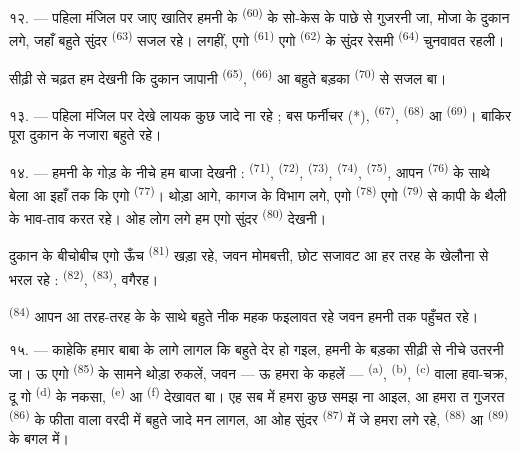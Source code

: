 १२. --- पहिला मंजिल पर जाए खातिर हमनी के 
\textsuperscript{(60)} के सो-केस के पाछे से गुजरनी जा, मोजा के दुकान लगे,
जहाँ बहुते सुंदर  \textsuperscript{(63)} सजल रहे। लगहीं,
एगो  \textsuperscript{(61)} एगो  \textsuperscript{(62)} के सुंदर रेसमी 
\textsuperscript{(64)} चुनवावत रहली।

सीढ़ी से चढ़त हम देखनी कि दुकान जापानी  \textsuperscript{(65)},
 \textsuperscript{(66)} आ बहुते बड़का 
\textsuperscript{(70)} से सजल बा।

१३. --- पहिला मंजिल पर देखे लायक कुछ जादे ना रहे ; बस फर्नीचर (*),
 \textsuperscript{(67)}, 
\textsuperscript{(68)} आ  \textsuperscript{(69)}।
बाकिर पूरा दुकान के नजारा बहुते  रहे।

१४. --- हमनी के गोड़ के नीचे हम बाजा देखनी : 
\textsuperscript{(71)},  \textsuperscript{(72)},
 \textsuperscript{(73)}, 
\textsuperscript{(74)},  \textsuperscript{(75)}, आपन
 \textsuperscript{(76)} के साथे बेला आ इहाँ तक कि एगो
 \textsuperscript{(77)}। थोड़ा आगे, कागज के विभाग लगे,
एगो  \textsuperscript{(78)} एगो 
\textsuperscript{(79)} से कापी के थैली के भाव-ताव करत रहे। ओह लोग लगे हम
एगो सुंदर  \textsuperscript{(80)} देखनी।

दुकान के बीचोबीच एगो ऊँच  \textsuperscript{(81)}
खड़ा रहे, जवन मोमबत्ती, छोट सजावट आ हर तरह के खेलौना से भरल रहे :
 \textsuperscript{(82)}, 
\textsuperscript{(83)}, वगैरह।

 \textsuperscript{(84)} आपन  आ
तरह-तरह के  के साथे बहुते नीक महक फइलावत रहे जवन हमनी तक
पहुँचत रहे।

\VUsaut{3.4mm}
\VUsaut{2.8mm}

१५. --- काहेकि हमार बाबा के लागे लागल कि बहुते देर हो गइल, हमनी के
बड़का सीढ़ी से नीचे उतरनी जा। ऊ एगो 
\textsuperscript{(85)} के सामने थोड़ा रुकलें, जवन — ऊ हमरा के कहलें —
 \textsuperscript{(a)}, 
\textsuperscript{(b)},  \textsuperscript{(c)}
 वाला हवा-चक्र, दू गो
 \textsuperscript{(d)} के नकसा, 
\textsuperscript{(e)} आ  \textsuperscript{(f)} देखावत बा।
एह सब में हमरा कुछ समझ ना आइल, आ हमरा त गुजरत  \textsuperscript{(86)} के फीता वाला वरदी में बहुते जादे मन लागल,
आ ओह सुंदर  \textsuperscript{(87)} में जे हमरा लगे रहे,
 \textsuperscript{(88)} आ  \textsuperscript{(89)}
के बगल में।

